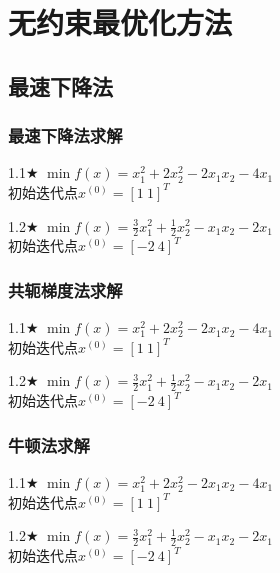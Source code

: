 \section{无约束最优化方法}

\subsection{最速下降法}

\subsubsection{最速下降法求解}

\begin{problem}{1.1$\bigstar$}
    $\min f(x)=x_1^2+2x_2^2-2x_1x_2-4x_1$\\
    初始迭代点${x^{(0)}}=[1\ 1]^T$
\end{problem}

\begin{problem}{1.2$\bigstar$}
    $\min f(x)=\frac{3}{2}x_1^2+\frac{1}{2}x_2^2-x_1x_2-2x_1$\\
初始迭代点${x^{(0)}}=[-2\ 4]^T$
\end{problem}

\subsubsection{共轭梯度法求解}

\begin{problem}{1.1$\bigstar$}
    $\min f(x)=x_1^2+2x_2^2-2x_1x_2-4x_1$\\
    初始迭代点${x^{(0)}}=[1\ 1]^T$
\end{problem}

\begin{problem}{1.2$\bigstar$}
    $\min f(x)=\frac{3}{2}x_1^2+\frac{1}{2}x_2^2-x_1x_2-2x_1$\\
    初始迭代点${x^{(0)}}=[-2\ 4]^T$
\end{problem}

\subsubsection{牛顿法求解}

\begin{problem}{1.1$\bigstar$}
    $\min f(x)=x_1^2+2x_2^2-2x_1x_2-4x_1$\\
    初始迭代点${x^{(0)}}=[1\ 1]^T$
\end{problem}

\begin{problem}{1.2$\bigstar$}
    $\min f(x)=\frac{3}{2}x_1^2+\frac{1}{2}x_2^2-x_1x_2-2x_1$\\
    初始迭代点${x^{(0)}}=[-2\ 4]^T$
\end{problem}